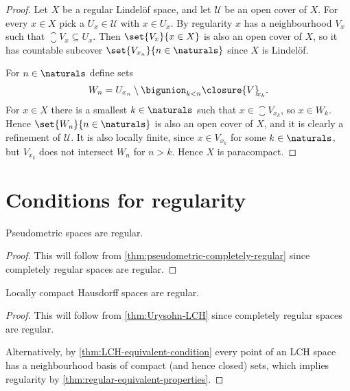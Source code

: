 \documentclass[article, a4paper, 11pt, oneside]{memoir}
\numberwithin{equation}{chapter}
\newcommand{\calU}{\mathcal{U}}
\begin{document}
\begin{proof}
    Let $X$ be a regular Lindelöf space, and let $\calU$ be an open cover of $X$. For every $x \in X$ pick a $U_x \in \calU$ with $x \in U_x$. By regularity $x$ has a neighbourhood $V_x$ such that $\closure{V}_{\!\!x} \subseteq U_x$. Then $\set{V_x}{x \in X}$ is also an open cover of $X$, so it has countable subcover $\set{V_{x_n}}{n \in \naturals}$ since $X$ is Lindelöf.

    For $n \in \naturals$ define sets
    \begin{equation*}
        W_n = U_{x_n} \setminus \bigunion_{k < n} \closure{V}_{\!\!x_k}.
    \end{equation*}
    For $x \in X$ there is a smallest $k \in \naturals$ such that $x \in \closure{V}_{\!\!x_k}$, so $x \in W_k$. Hence $\set{W_n}{n \in \naturals}$ is also an open cover of $X$, and it is clearly a refinement of $\calU$. It is also locally finite, since $x \in V_{x_k}$ for some $k \in \naturals$, but $V_{x_k}$ does not intersect $W_n$ for $n > k$. Hence $X$ is paracompact.
\end{proof}


\section{Conditions for regularity}

\begin{corollary}
    Pseudometric spaces are regular.
\end{corollary}

\begin{proof}
    This will follow from \cref{thm:pseudometric-completely-regular} since completely regular spaces are regular.
\end{proof}


\begin{corollary}
    Locally compact Hausdorff spaces are regular.
\end{corollary}

\begin{proof}
    This will follow from \cref{thm:Urysohn-LCH} since completely regular spaces are regular.

    Alternatively, by \cref{thm:LCH-equivalent-condition} every point of an LCH space has a neighbourhood basis of compact (and hence closed) sets, which implies regularity by \cref{thm:regular-equivalent-properties}.
\end{proof}
\end{document}
